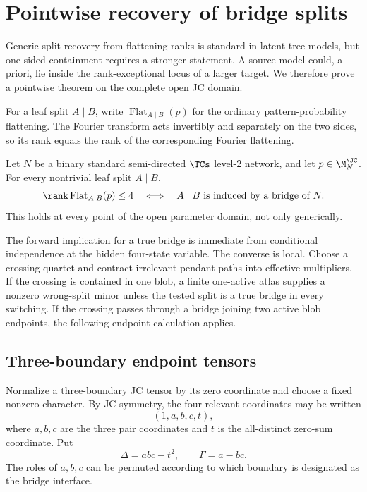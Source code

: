 \section{Pointwise recovery of bridge splits}\label{sec:cuts}

Generic split recovery from flattening ranks is standard in latent-tree models, but one-sided containment requires a stronger statement.  A source model could, a priori, lie inside the rank-exceptional locus of a larger target.  We therefore prove a pointwise theorem on the complete open JC domain.

For a leaf split $A\mid B$, write $\operatorname{Flat}_{A\mid B}(p)$ for the ordinary pattern-probability flattening.  The Fourier transform acts invertibly and separately on the two sides, so its rank equals the rank of the corresponding Fourier flattening.

\begin{theorem}\label{thm:pointwise-cut}
Let $N$ be a binary standard semi-directed $\TCs$ level-2 network, and let $p\in\M_N^{\JC}$.  For every nontrivial leaf split $A\mid B$,
\[
\rank\operatorname{Flat}_{A\mid B}(p)\le4
\quad\Longleftrightarrow\quad
A\mid B\text{ is induced by a bridge of }N.
\]
This holds at every point of the open parameter domain, not only generically.
\end{theorem}

The forward implication for a true bridge is immediate from conditional independence at the hidden four-state variable.  The converse is local.  Choose a crossing quartet and contract irrelevant pendant paths into effective multipliers.  If the crossing is contained in one blob, a finite one-active atlas supplies a nonzero wrong-split minor unless the tested split is a true bridge in every switching.  If the crossing passes through a bridge joining two active blob endpoints, the following endpoint calculation applies.

\subsection{Three-boundary endpoint tensors}

Normalize a three-boundary JC tensor by its zero coordinate and choose a fixed nonzero character.  By JC symmetry, the four relevant coordinates may be written
\[
(1,a,b,c,t),
\]
where $a,b,c$ are the three pair coordinates and $t$ is the all-distinct zero-sum coordinate.  Put
\[
\Delta=abc-t^2,
\qquad
\Gamma=a-bc.
\]
The roles of $a,b,c$ can be permuted according to which boundary is designated as the bridge interface.

